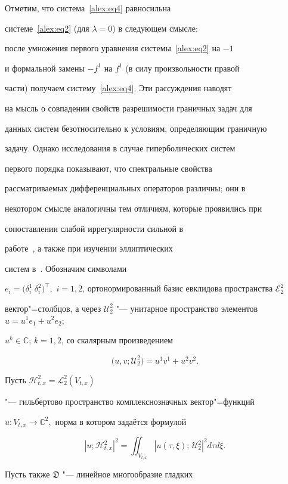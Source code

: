 Отметим, что система~\eqref{alex:eq4} равносильна

системе~\eqref{alex:eq2} (для $\lambda=0$) в следующем смысле:

после умножения первого уравнения системы~\eqref{alex:eq2} на $-1$

и формальной замены $-f^1$ на $f^1$ (в силу произвольности правой

части) получаем систему~\eqref{alex:eq4}. Эти рассуждения наводят

на мысль о совпадении свойств разрешимости граничных задач для

данных систем безотносительно к условиям, определяющим граничную

задачу. Однако исследования в случае гиперболических систем

первого порядка показывают, что спектральные свойства

рассматриваемых дифференциальных операторов различны; они в

некотором смысле аналогичны тем отличиям, которые проявились при

сопоставлении слабой иррегулярности сильной в

работе~\cite{alex:bib11}, а также при изучении эллиптических

систем в~\cite{alex:bib8}. Обозначим символами

$e_i=\bigl(\delta_i^1~\delta_i^2\bigr)^\top,$ $i=1, 2$, ортонормированный базис евклидова пространства $\mathcal{E}_2^2$

вектор"=столбцов, а через $\mathcal{U}_2^2$ "--- унитарное  пространство элементов $u=u^1e_1+u^2e_2$; 

$u^k \in\mathbb{C}$; $k=1, 2$, со скалярным произведением 

$$\bigl(u,v;\mathcal{U}_2^2\bigr)= u^1\overline{v^1}+u^2\overline{v^2}.$$

Пусть $\mathcal{H}^2_{t,x}=\mathcal{L}_2^2\left(V_{t,x}\right)$

"--- гильбертово пространство комплекснозначных вектор"=функций

$u:V_{t,x}\to\mathbb{C}^2,$ норма в котором задаётся формулой

$$

\left|u;

\mathcal{H}^2_{t,x}\right|^2=\iint_{V_{t,x}}\left|u(\tau,\xi);\,\mathcal{U}_2^2\right|^2

d\tau d\xi.

$$

Пусть также $\mathfrak{D}$ "--- линейное многообразие гладких

